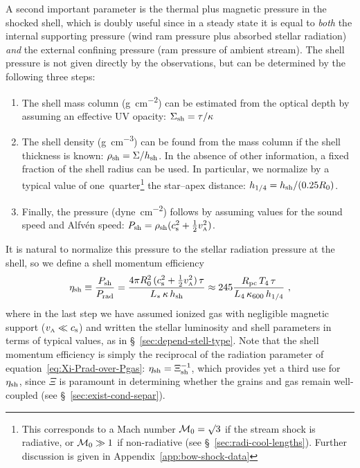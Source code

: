 \message{ !name(bs-bw-dw-03.tex)}\documentclass[useAMS, usenatbib, a4paper]{mnras}
\begin{document}
A second important parameter is the thermal plus magnetic pressure in
the shocked shell, which is doubly useful since in a steady state it
is equal to \emph{both} the internal supporting pressure (wind ram
pressure plus absorbed stellar radiation) \emph{and} the external
confining pressure (ram pressure of ambient stream).  The shell
pressure is not given directly by the observations, but can be
determined by the following three steps:
\begin{enumerate}[P1.]
\item \label{P1} The shell mass column (\si{g.cm^{-2}}) can be
  estimated from the optical depth by assuming an effective UV
  opacity: \(\Sigma_{\text{sh}} = \tau / \kappa\)
\item \label{P2} The shell density (\si{g.cm^{-3}}) can be found from
  the mass column if the shell thickness is known:
  \(\rho_{\text{sh}} = \Sigma / h_{\text{sh}}\).  In the absence of other
  information, a fixed fraction of the shell radius can be used.  In
  particular, we normalize by a typical value of
  one~quarter\footnote{%
    This corresponds to a Mach number \(\mathcal{M}_0 = \surd 3\) if the stream
    shock is radiative, or \(\mathcal{M}_0 \gg 1\) if non-radiative (see
    \S~\ref{sec:radi-cool-lengths}).  Further discussion is given in
    Appendix~\ref{app:bow-shock-data}} %
  the star--apex distance: \(h_{1/4} = h_{\text{sh}} / (0.25 R_0)\).
\item \label{P3} Finally, the pressure (\si{dyne.cm^{-2}}) follows by
  assuming values for the sound speed and Alfvén speed:
  \(P_{\text{sh}} = \rho_{\text{sh}} (c_{\text{s}}^2 + \frac12 v_{\scriptscriptstyle\text{A}}^2) \).
\end{enumerate}
It is natural to normalize this pressure to the stellar radiation
pressure at the shell, so we define a shell momentum efficiency
\newcommand\pc{\ensuremath{_{\text{pc}}}}
\begin{equation}
  \label{eq:eta-shell}
  \eta\shell \equiv \frac{P\shell}{P\rad}
  = \frac{4\pi R_0^2\, (\sound^2 + \frac12 v\alfven^2)\, \tau}{L_*\, \kappa\, h\shell}
  \approx 245 \frac{R\pc \, T_4 \, \tau}{L_4 \, \kappa_{600} \, h_{1/4}} \ , 
\end{equation}
where in the last step we have assumed ionized gas with negligible
magnetic support (\(v_{\scriptscriptstyle\text{A}} \ll c_{\text{s}}\)) and written the stellar
luminosity and shell parameters in terms of typical values, as in
\S~\ref{sec:depend-stell-type}.  Note that the shell momentum
efficiency is simply the reciprocal of the radiation parameter of
equation~\eqref{eq:Xi-Prad-over-Pgas}:
\(\eta_{\text{sh}} = \Xi_{\text{sh}}^{-1}\), which provides yet a third use for
\(\eta_{\text{sh}}\), since \(\Xi\) is paramount in determining whether the
grains and gas remain well-coupled (see
\S~\ref{sec:exist-cond-separ}).
\end{document}
